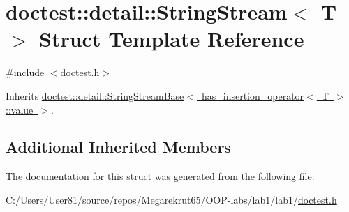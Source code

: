 \hypertarget{structdoctest_1_1detail_1_1_string_stream}{}\section{doctest\+:\+:detail\+:\+:String\+Stream$<$ T $>$ Struct Template Reference}
\label{structdoctest_1_1detail_1_1_string_stream}


{\ttfamily \#include $<$doctest.\+h$>$}



Inherits \mbox{\hyperlink{structdoctest_1_1detail_1_1_string_stream_base}{doctest\+::detail\+::\+String\+Stream\+Base$<$ has\+\_\+insertion\+\_\+operator$<$ T $>$\+::value $>$}}.

\subsection*{Additional Inherited Members}


The documentation for this struct was generated from the following file\+:\begin{DoxyCompactItemize}
\item 
C\+:/\+Users/\+User81/source/repos/\+Megarekrut65/\+O\+O\+P-\/labs/lab1/lab1/\mbox{\hyperlink{doctest_8h}{doctest.\+h}}\end{DoxyCompactItemize}
